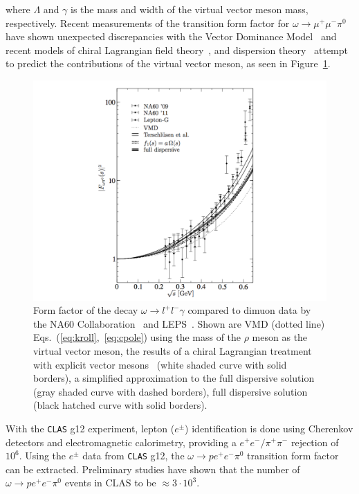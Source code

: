 \documentclass[epj]{webofc}
\begin{document}
 where $\Lambda$ and $\gamma$ is the mass and width of the virtual vector meson mass, respectively.
 Recent measurements of the transition form factor for $\omega \to \mu^+\mu^- \pi^0$ have shown unexpected discrepancies with the Vector Dominance Model~\cite{bib5} and recent models of chiral Lagrangian field theory~\cite{bib6}, and dispersion theory~\cite{Schneider} attempt to predict the contributions of the virtual vector meson, as seen in Figure~\ref{fig:omega_ff}.
 \begin{figure}[h!]
 	\centerline{\includegraphics[width=250 pt, height=130 pt]{figures/omega_ff_bastian_edit.pdf}}
 	\caption{Form factor of the decay $\omega \to l^+l^- \gamma$ compared to dimuon data by the NA60 Collaboration~\cite{bib5,bib5_0} and LEPS~\cite{LEPS}. Shown are VMD (dotted line) Eqs.~(\ref{eq:kroll},~\ref{eq:cpole}) using the mass of the $\rho$ meson as the virtual vector meson, the results of a chiral Lagrangian treatment with explicit vector mesons~\cite{bib6} (white shaded curve with solid borders), a simplified approximation to the full dispersive solution~\cite{Schneider} (gray shaded curve with dashed borders), full dispersive solution~\cite{Schneider} (black hatched curve with solid borders).~\cite{Schneider}}
 	\label{fig:omega_ff}
 \end{figure}
 
With the \textsc{\texttt{CLAS}} g12 experiment, lepton ($e^{\pm}$) identification is done using Cherenkov detectors and electromagnetic calorimetry, providing a $e^{+}e^{-}/\pi^{+}\pi^{-}$ rejection of $10^6$. Using the $e^{\pm}$ data from \textsc{\texttt{CLAS}} g12, the $ \omega \to p e^+ e^- \pi^0$ transition form factor can be extracted. Preliminary studies have shown that the number of $ \omega \to p e^+ e^- \pi^0$ events in CLAS to be $\approx 3\cdot 10^3$.
\FloatBarrier
\end{document}

